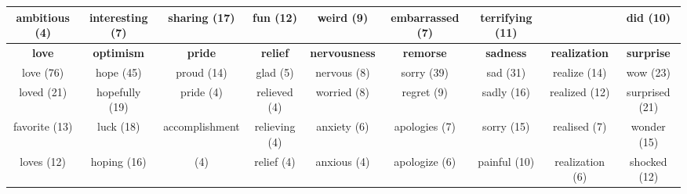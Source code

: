 \documentclass[11pt,a4paper]{article}
\begin{document}
\begin{table*}[t!]
{\begin{centering}
\begin{tabular}{|cccc|ccccc|}
ambitious (4)                            & interesting (7)                          & sharing (17)                            & fun (12)                             & weird (9)                                 & embarrassed (7)                             &  terrifying (11)                              &   \multicolumn{1}{c|}{}                                            & did (10)                                \\ \hline
\cellcolor[HTML]{BEECAF}\textbf{love}       & \cellcolor[HTML]{BEECAF}\textbf{optimism}   & \cellcolor[HTML]{BEECAF}\textbf{pride}     & \cellcolor[HTML]{BEECAF}\textbf{relief} & \cellcolor[HTML]{A6CBF7}\textbf{nervousness} & \cellcolor[HTML]{A6CBF7}\textbf{remorse}       & \multicolumn{1}{c|}{\cellcolor[HTML]{A6CBF7}\textbf{sadness}}        & \cellcolor[HTML]{FFFC9E}\textbf{realization}  & \cellcolor[HTML]{FFFC9E}\textbf{surprise}  \\
love (76)                                & hope (45)                                & proud (14)                              & glad (5)                             & nervous (8)                               & sorry (39)                                  & \multicolumn{1}{c|}{sad (31) }                                    & realize (14)                               & wow (23)                                \\
loved (21)                               & hopefully (19)                           & pride (4)                               & relieved (4)                         & worried (8)                               & regret (9)                                  & \multicolumn{1}{c|}{sadly (16)}                                   & realized (12)                              & surprised (21)                          \\
favorite (13)                            & luck (18)                                & accomplishment                     & relieving (4)                        & anxiety (6)                               & apologies (7)                               & \multicolumn{1}{c|}{sorry (15)}                                   & realised (7)                               & wonder (15)                             \\
loves (12)                               & hoping (16)                              &                       (4)               & relief (4)                           & anxious (4)                               & apologize (6)                               & \multicolumn{1}{c|}{painful (10)    }                             & realization (6)                            & shocked (12)                            \\

\end{tabular}
\end{centering}}
\end{table*}
\end{document}
